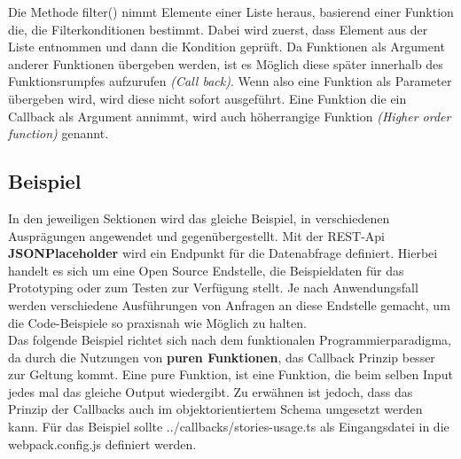 \noindent
Die Methode filter() nimmt Elemente einer Liste heraus, basierend einer Funktion die, die Filterkonditionen bestimmt. Dabei wird zuerst, dass Element aus der Liste entnommen und dann die Kondition geprüft. Da Funktionen als Argument anderer Funktionen übergeben werden, ist es Möglich diese \glqq{}später\grqq{} innerhalb des Funktionsrumpfes aufzurufen \textit{(\glqq{}Call back\grqq{})}. Wenn also eine Funktion als Parameter übergeben wird, wird diese nicht sofort ausgeführt. Eine Funktion die ein Callback als Argument annimmt, wird auch höherrangige Funktion \textit{(Higher order function)} genannt\cite{callbacks-example}.

\subsection{Beispiel}
In den jeweiligen Sektionen wird das gleiche Beispiel, in verschiedenen Ausprägungen angewendet und gegenübergestellt. Mit der REST-Api \textbf{JSONPlaceholder} wird ein Endpunkt für die Datenabfrage definiert. Hierbei handelt es sich um eine Open Source Endstelle, die Beispieldaten für das Prototyping oder zum Testen zur Verfügung stellt. Je nach Anwendungsfall werden verschiedene Ausführungen von Anfragen an diese Endstelle gemacht, um die Code-Beispiele so praxisnah wie Möglich zu halten.\\

\noindent
Das folgende Beispiel richtet sich nach dem funktionalen Programmierparadigma, da durch die Nutzungen von \textbf{puren Funktionen}, das Callback Prinzip besser zur Geltung kommt. Eine pure Funktion, ist eine Funktion, die beim selben Input jedes mal das gleiche Output wiedergibt. Zu erwähnen ist jedoch, dass das Prinzip der Callbacks auch im objektorientiertem Schema umgesetzt werden kann. Für das Beispiel sollte ../callbacks/stories-usage.ts als Eingangsdatei in die webpack.config.js definiert werden.

